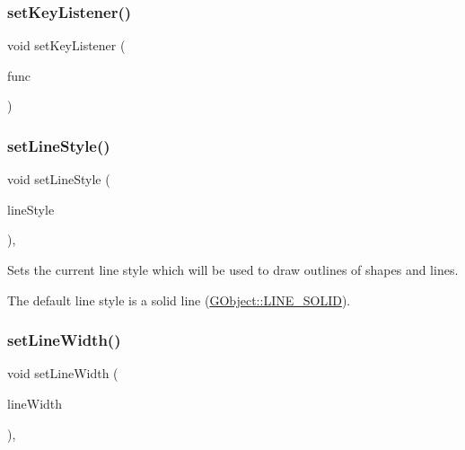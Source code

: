\mbox{\label{classGWindow_ae48ecea73606c7bd9423e1c7cc589cc9}} 
\subsubsection{\texorpdfstring{set\+Key\+Listener()}{setKeyListener()}\hspace{0.1cm}{\footnotesize\ttfamily [2/2]}}
{\footnotesize\ttfamily void set\+Key\+Listener (\begin{DoxyParamCaption}\item[{G\+Event\+Listener\+Void}]{func }\end{DoxyParamCaption})\hspace{0.3cm}{\ttfamily [virtual]}}

\mbox{\label{classGDrawingSurface_a6bfe14a77101db0fb97b5a7e07a5526b}} 
\subsubsection{\texorpdfstring{set\+Line\+Style()}{setLineStyle()}}
{\footnotesize\ttfamily void set\+Line\+Style (\begin{DoxyParamCaption}\item[{\mbox{\hyperlink{classGObject_a86e0f5648542856159bb40775c854aa7}{G\+Object\+::\+Line\+Style}}}]{line\+Style }\end{DoxyParamCaption})\hspace{0.3cm}{\ttfamily [virtual]}, {\ttfamily [inherited]}}



Sets the current line style which will be used to draw outlines of shapes and lines. 

The default line style is a solid line (\mbox{\hyperlink{classGObject_a86e0f5648542856159bb40775c854aa7a700c78bc2cd76acaab26651bf7b4941f}{G\+Object\+::\+L\+I\+N\+E\+\_\+\+S\+O\+L\+ID}}). \mbox{\label{classGForwardDrawingSurface_a22b7be843264ca79a9bb3851ce3368b9}} 
\subsubsection{\texorpdfstring{set\+Line\+Width()}{setLineWidth()}}
{\footnotesize\ttfamily void set\+Line\+Width (\begin{DoxyParamCaption}\item[{double}]{line\+Width }\end{DoxyParamCaption})\hspace{0.3cm}{\ttfamily [virtual]}, {\ttfamily [inherited]}}

